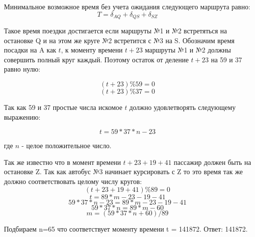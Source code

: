 \solutionSection
Минимальное возможное время без учета ожидания следующего маршрута равно:
\[ T = \delta_{AQ} + \delta_{QS} + \delta_{SZ}\]

Такое время поездки достигается если маршруты №1 и №2 встретяться на остановке Q и на этом же круге №2 встретится с №3 на S. Обозначим время посадки на A как $t$, к моменту времени $t+23$ маршруты №1 и №2 должны совершить полный круг каждый. Поэтому остаток от деление $t+23$ на 59 и 37 равно нулю:

\[ (t + 23) \% 59 = 0\]
\[ (t + 23) \% 37 = 0\]

Так как 59 и 37 простые числа искомое $t$ должно удовлетворять следующему выражению:

\[ t = 59 * 37 * n - 23\]

где $n$ - целое положительное число.

Так же известно что в момент времени $t+23+19+41$ пассажир должен быть на остановке Z. Так как автобус №3 начинает курсировать с Z то это время так же должно соответствовать целому числу кругов:
\[ (t + 23 + 19 + 41) \% 89 = 0\]
\[ t = 89 * m - 23 - 19 - 41\]
\[ 59 * 37 * n - 23 = 89 * m - 23 - 19 - 41\]
\[ 59 * 37 * n = 89 * m - 60\]
\[ m = (59 * 37 * n + 60)/89 \]

Подбираем n=65 что соответствует моменту времени t = 141872.
Ответ: 141872.


